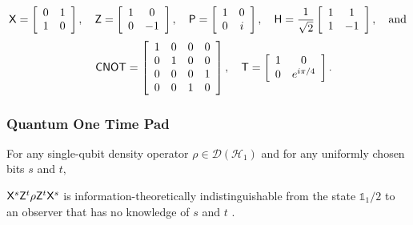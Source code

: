 $${\sf X} = \left[\begin{array}{cc} 0 & 1\\ 1 & 0\end{array}\right],
\quad{\sf Z} = \left[\begin{array}{cc} 1 & 0\\ 0 & -1\end{array}\right],
\quad{\sf P} = \left[\begin{array}{cc} 1 & 0\\ 0 & i\end{array}\right],
 \quad{\sf H} = \frac{1}{\sqrt{2}}\left[\begin{array}{cc}1 & 1\\1 & -1\end{array}\right], \quad\mbox{and}$$
$$\quad{\sf CNOT} = \left[\begin{array}{cccc} 1 & 0 & 0 & 0\\ 0 & 1 & 0 & 0\\ 0 & 0 & 0 & 1\\ 0 & 0 & 1 & 0\end{array}\right],
\quad{\sf T} = \left[\begin{array}{cc} 1 & 0\\ 0 & e^{i\pi/4}\end{array}\right].$$

\subsubsection*{Quantum One Time Pad}
For any single-qubit density operator $\rho \in \mathcal{D} (\mathcal{H}_1)$ and for any uniformly chosen bits $s$ and $t,$ 

 ${\sf X}^s {\sf Z}^t \rho {\sf Z}^t {\sf X}^s$ is information-theoretically indistinguishable from the state $\mathds{1}_1/2$ to an observer that has no knowledge of $s$ and $t$ \cite{AMTW00}.

%

